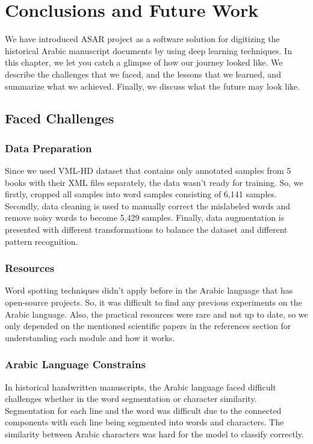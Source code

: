 \chapter{Conclusions and Future Work}



We have introduced ASAR project as a software solution for digitizing the historical Arabic manuscript documents by using deep learning techniques. In this chapter, we let you catch a glimpse of how our journey looked like. We describe the challenges that we faced, and the lessons that we learned, and summarize what we achieved. Finally, we discuss what the future may look like.

\section{Faced Challenges}
\subsection{Data Preparation}
Since we used VML-HD dataset that contains only annotated samples from 5 books with their XML files separately, the data wasn't ready for training. So, we firstly, cropped all samples into word samples consisting of 6,141 samples. Secondly, data cleaning is used to manually correct the mislabeled words and remove noisy words to become 5,429 samples. Finally, data augmentation is presented with different transformations to balance the dataset and different pattern recognition.

\subsection{Resources}
Word spotting techniques didn't apply before in the Arabic language that has open-source projects. So, it was difficult to find any previous experiments on the Arabic language. Also, the practical resources were rare and not up to date, so we only depended on the mentioned scientific papers in the references section for understanding each module and how it works.

\subsection{Arabic Language Constrains}
In historical handwritten manuscripts, the Arabic language faced difficult challenges whether in the word segmentation or character similarity. Segmentation for each line and the word was difficult due to the connected components with each line being segmented into words and characters. The similarity between Arabic characters was hard for the model to classify correctly.

